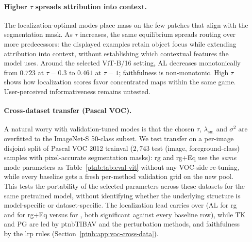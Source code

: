 \paragraph{Higher $\tau$ spreads attribution into context.}
The localization-optimal modes place mass on the few patches that align with the segmentation mask. As $\tau$ increases, the same equilibrium spreads routing over more predecessors: the displayed examples retain object focus while extending attribution into context, without establishing which contextual features the model uses. Around the selected ViT-B/16 setting, AL decreases monotonically from $0.723$ at $\tau{=}0.3$ to $0.461$ at $\tau{=}1$; faithfulness is non-monotonic. High $\tau$ shows how localization scores favor concentrated maps within the same game. User-perceived informativeness remains untested.

\begin{table}[htbp]
    \centering
    \caption[ViT-B/16 Routing Game attention rule ablation]{\ac{vit}-B/16, \ac{rg}: attention ablation on 565 ImageNet-S test images at the anchor and validation-selected settings. Cells: gradient fallback above; composite Value rule (Theorem~\ref{ptnb:thm:attn-ab-recovery}, gray) below. Configurations: Section~\ref{ptnb:app:config-symbols}. $^{\dagger}$: paired bootstrap (McNemar for PG), Holm-corrected over the table, $p<0.05$.}
    \label{ptnb:tab:abl-gradient-fallback}
%
\end{table}

\paragraph{Cross-dataset transfer (Pascal VOC).}
A natural worry with validation-tuned modes is that the chosen $\tau$, $\lambda_{\mathrm{sm}}$ and
$\sigma^2$ are overfitted to the ImageNet-S 50-class subset. We test transfer on a per-image
disjoint split of Pascal VOC 2012 trainval ($2{,}743$ test (image, foreground-class) samples with
pixel-accurate segmentation masks): \ac{rg} and \ac{rg}+Eq use the \emph{same} mode parameters as
Table~\ref{ptnb:tab:eval-vit} without any VOC-side re-tuning, while every baseline gets a fresh
per-method validation grid on the new pool. This tests the portability of the selected parameters
across these datasets for the same pretrained model, without identifying whether the underlying
structure is model-specific or dataset-specific. The localization lead carries over (AL
\vocRGlocAL{} for \ac{rg} and \vocRGEqlocAL{} for \ac{rg}+Eq versus \vocBestBaseAL{} for
\vocBestBaseALname{}, both significant against every baseline row), while TK and PG are led by
\ac{ptnbTIBAV} and the perturbation methods, and faithfulness by the \ac{lrp} rules
(Section~\ref{ptnb:app:voc-cross-data}).

